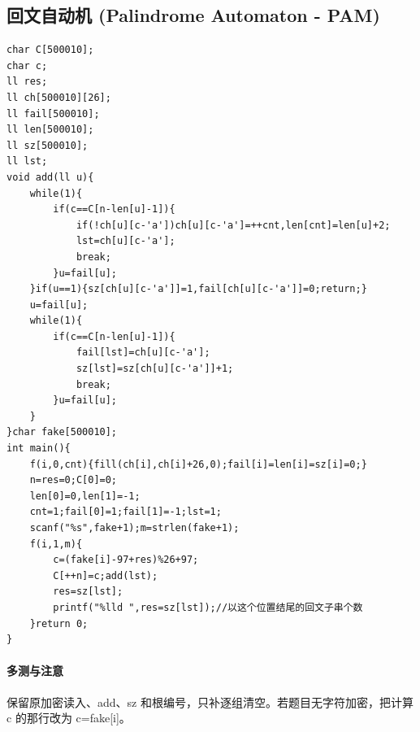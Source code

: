 \subsection{回文自动机 (Palindrome Automaton - PAM)}
\begin{lstlisting}
char C[500010];
char c;
ll res;
ll ch[500010][26];
ll fail[500010];
ll len[500010];
ll sz[500010];
ll lst;
void add(ll u){
	while(1){
		if(c==C[n-len[u]-1]){
			if(!ch[u][c-'a'])ch[u][c-'a']=++cnt,len[cnt]=len[u]+2;
			lst=ch[u][c-'a'];
			break;
		}u=fail[u];
	}if(u==1){sz[ch[u][c-'a']]=1,fail[ch[u][c-'a']]=0;return;}
	u=fail[u];
	while(1){
		if(c==C[n-len[u]-1]){
			fail[lst]=ch[u][c-'a'];
			sz[lst]=sz[ch[u][c-'a']]+1;
			break;
		}u=fail[u];
	}
}char fake[500010];
int main(){
	f(i,0,cnt){fill(ch[i],ch[i]+26,0);fail[i]=len[i]=sz[i]=0;}
    n=res=0;C[0]=0;
    len[0]=0,len[1]=-1;
	cnt=1;fail[0]=1;fail[1]=-1;lst=1;
	scanf("%s",fake+1);m=strlen(fake+1);
	f(i,1,m){
		c=(fake[i]-97+res)%26+97;
		C[++n]=c;add(lst);
		res=sz[lst];
		printf("%lld ",res=sz[lst]);//以这个位置结尾的回文子串个数
	}return 0;
}
\end{lstlisting}

\paragraph{多测与注意} 保留原加密读入、add、sz 和根编号，只补逐组清空。若题目无字符加密，把计算 c 的那行改为 c=fake[i]。

\newpage
